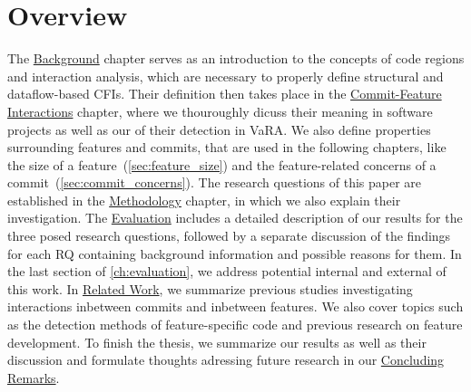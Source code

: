 \section{Overview}

The \hyperref[ch:background]{Background} chapter serves as an introduction to the concepts of code regions and interaction analysis, which are necessary to properly define structural and dataflow-based CFIs.
Their definition then takes place in the \hyperref[ch:example_chapter]{Commit-Feature Interactions} chapter, where we thouroughly dicuss their meaning in software projects as well as our  of their detection in VaRA.
We also define properties surrounding features and commits, that are used in the following chapters, like the size of a feature~(\ref{sec:feature_size}) and the feature-related concerns of a commit~(\ref{sec:commit_concerns}).
The research questions of this paper are established in the \hyperref[ch:methodology]{Methodology} chapter, in which we also explain their investigation.
The \hyperref[ch:evaluation]{Evaluation} includes a detailed description of our results for the three posed research questions, followed by a separate discussion of the findings for each RQ containing background information and possible reasons for them.
In the last section of \autoref{ch:evaluation}, we address potential internal and external  of this work.
In \hyperref[ch:related_work]{Related Work}, we summarize previous studies investigating interactions inbetween commits and inbetween features.
We also cover topics such as the detection methods of feature-specific code and previous research on feature development. %
To finish the thesis, we summarize our results as well as their discussion and formulate thoughts adressing future research in our \hyperref[ch:conclusion]{Concluding Remarks}.

